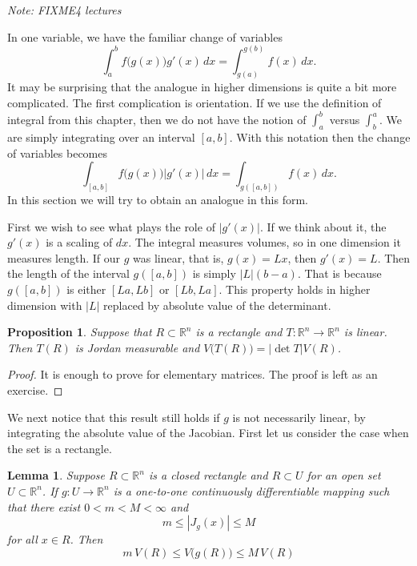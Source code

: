 \documentclass[12pt]{book}
\newcommand{\abs}[1]{\left\lvert {#1} \right\rvert}
\newcommand{\R}{{\mathbb{R}}}
\newcommand{\sectionnotes}[1]{\noindent \emph{Note: #1} \medskip \par}
\theoremstyle{plain}
\newtheorem{lemma}[thm]{Lemma}
\newtheorem{prop}[thm]{Proposition}
\theoremstyle{remark}
\theoremstyle{definition}
\theoremstyle{exercise}
\theoremstyle{example}
\begin{document}
\sectionnotes{FIXME4 lectures}

In one variable, we have the familiar change of variables
\begin{equation*}
\int_a^b f\bigl(g(x)\bigr) g'(x)\, dx = 
\int_{g(a)}^{g(b)} f(x) \, dx .
\end{equation*}
It may be surprising that the analogue in higher dimensions is quite
a bit more complicated.  The first complication is orientation.  If we use
the definition of integral from this chapter, then we do not have the notion
of $\int_a^b$ versus $\int_b^a$.  We are simply integrating over an
interval $[a,b]$.  With this notation then the change of variables becomes
\begin{equation*}
\int_{[a,b]} f\bigl(g(x)\bigr) \abs{g'(x)}\, dx = 
\int_{g([a,b])} f(x) \, dx .
\end{equation*}
In this section we will try to obtain an analogue in this form.

First we wish to see what plays the role of $\abs{g'(x)}$.  If we think about it,
the $g'(x)$ is a scaling of $dx$.  The integral measures volumes, so in one
dimension it measures length.  If our $g$ was linear, that is, $g(x)=Lx$, then
$g'(x) = L$.  Then the length of the interval $g([a,b])$ is simply
$\abs{L}(b-a)$.  That is because $g([a,b])$ is either $[La,Lb]$ or
$[Lb,La]$.  This property holds in higher dimension with $\abs{L}$ replaced
by absolute value of the determinant.

\begin{prop} \label{prop:volrectdet}
Suppose that $R \subset \R^n$ is a rectangle
and $T \colon \R^n \to \R^n$ is linear.  Then
$T(R)$ is Jordan measurable and $V\bigl(T(R)\bigr) = \abs{\det T} V(R)$.
\end{prop}

\begin{proof}
It is enough to prove for elementary matrices.  The proof is left as an
exercise.
\end{proof}

We next notice that this result still holds if $g$ is not necessarily
linear, by integrating the absolute value of the Jacobian.
First let us consider the case when the set is a rectangle.

\begin{lemma}
Suppose $R \subset \R^n$ is a closed rectangle
and $R \subset U$ for an open set $U \subset \R^n$.  If
$g \colon U \to \R^n$ is a one-to-one
continuously differentiable mapping such that
there exist $0 < m < M < \infty$ and
\begin{equation*}
m \leq \abs{J_g(x)} \leq M
\end{equation*}
for all $x \in R$.
Then
\begin{equation*}
m \, V(R) \leq V\bigl(g(R)\bigr) \leq M \, V(R)
\end{equation*}
\end{lemma}
\end{document}
